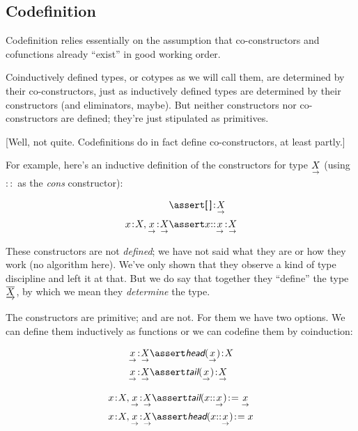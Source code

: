 \documentclass{article}
\begin{document}
\subsection{Codefinition}

Codefinition relies essentially on the assumption that co-constructors
and cofunctions already ``exist'' in good working order.

Coinductively defined types, or cotypes as we will call them, are
determined by their co-constructors, just as inductively defined types
are determined by their constructors (and eliminators, maybe). But
neither constructors nor co-constructors are defined; they're just
stipulated as primitives.

[Well, not quite. Codefinitions do in fact define co-constructors, at
  least partly.]

For example, here's an inductive definition of the constructors for
type \(\underset{\rightarrow}{X}\) (using \(\mathpunct{::}\) as the \textit{cons}
constructor):

\begin{align}
  & \linfer \tj{\listld\,\listrd}{\List{X}} \\
  \tj{x}{X}, \tj{\seq{x}}{\List{X}} &\linfer \tj{x\cons{}\seq{x}}{\List{X}} \\
\end{align}

These constructors are not \textit{defined}; we have not said what
they are or how they work (no algorithm here). We've only shown that
they observe a kind of type discipline and left it at that. But we do
say that together they ``define'' the type \(\underrightarrow{\overline{X}}\), by which
we mean they \textit{determine} the type.

The constructors are primitive; \head{} and \tail{} are not. For them
we have two options. We can define them inductively as functions or we
can codefine them by coinduction:

\begin{align}
  \tj{\seq{x}}{\List{X}} & \linfer \tj{\head(\seq{x})}{X} \\
  \tj{\seq{x}}{\List{X}} & \linfer \tj{\tail(\seq{x})}{\List X}
\end{align}

\begin{align}
  \tj{x}{X},\tj{\seq{x}}{\List{X}} & \linfer \tj{\tail(x\cons{}\seq{x})} = \seq{x} \\
  \tj{x}{X},\tj{\seq{x}}{\List{X}} & \linfer \tj{\head(x\cons{}\seq{x})} = x
\end{align}
\end{document}
